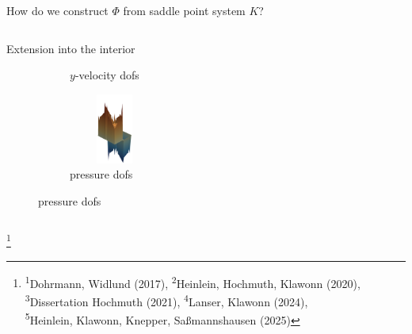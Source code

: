 \begin{frame}{How do we construct $\varPhi$ from saddle point system $K$?}
\begin{columns}
\begin{column}{0.52\textwidth}
{\begin{block}{\normalsize Extension into the interior}
\begin{figure}
\begin{subfigure}{0.29\textwidth}
							\vspace*{-5mm}
							\caption{$y$-velocity dofs}
						\end{subfigure}
						\hspace{12mm}
						\begin{subfigure}{0.29\textwidth}
							\centering
							\vspace*{-3mm}
							\includegraphics[width=3cm,height=23mm]{images/RGDSW-p-cut.png}
							\vspace*{-5mm}
							\caption{pressure dofs}
						\end{subfigure}
					\end{figure}
					\vspace{-4mm}
				\end{block}
			}
		\end{column}
	\end{columns}
	{\let\thefootnote\relax\footnote{{\tiny \!\!\!\!\textsuperscript{1}Dohrmann, Widlund (2017), \textsuperscript{2}Heinlein, Hochmuth, Klawonn (2020),  \textsuperscript{3}Dissertation Hochmuth (2021),  \textsuperscript{4}Lanser, Klawonn (2024),\\\hspace{3em}\!\!\!\!\!\!\textsuperscript{5}Heinlein, Klawonn, Knepper, Saßmannshausen (2025)}}}
\end{frame}

